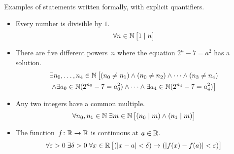 \documentclass[10pt,t]{beamer}
\begin{document}
\begin{frame}
Examples of statements written formally, with explicit quantifiers.

\begin{itemize}
\item Every number is divisible by $1$.
  \begin{equation*}
    \forall n\in\mathbb{N}\,\big[1\mid n\big]
  \end{equation*}

\pause
\item There are five different powers~$n$ where the equation $2^n-7=a^2$ has a solution.
  \begin{multline*}
    \exists n_0, \ldots, n_4\in\mathbb{N}\, \big[(n_0\neq n_1) 
                                     \wedge (n_0\neq n_2) 
                                     \wedge \cdots 
                                     \wedge (n_3\neq n_4)  \\
                                     \wedge \exists a_0\in\mathbb{N}(2^{n_0}-7=a_0^2)
                                     \wedge\cdots\wedge
                                     \exists a_4\in\mathbb{N}(2^{n_4}-7=a_4^2)\big]
  \end{multline*}

\pause
\item Any two integers have a common multiple.
  \begin{equation*}
    \forall n_0,n_1\in\mathbb{N}\;\exists m\in\mathbb{N}\,
        \big[(n_0\mid m)\wedge (n_1\mid m)\big]
  \end{equation*}

\pause
\item The function~$\mbox{$f\colon \mathbb{R}\to \mathbb{R}$}$ is continuous at $a\in\mathbb{R}$.
  \begin{equation*}
    \forall \varepsilon >0\;\exists \delta > 0\;\forall x\in\mathbb{R}\,
        \big[(\lvert x-a\rvert<\delta)\rightarrow (\lvert f(x)-f(a)\rvert<\varepsilon)\big]
  \end{equation*}
\end{itemize}
\end{frame}
\end{document}
